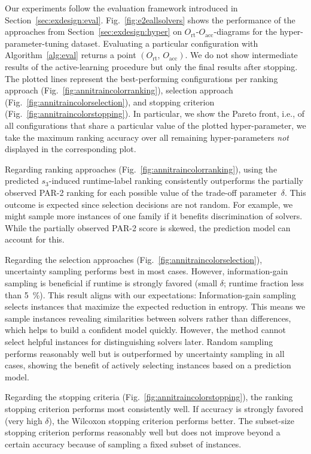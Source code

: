 \documentclass[runningheads]{llncs}
\begin{document}
Our experiments follow the evaluation framework introduced in Section~\ref{sec:exdesign:eval}.
Fig.~\ref{fig:e2eallsolvers} shows the performance of the approaches from Section~\ref{sec:exdesign:hyper} on $O_{\operatorname{rt}}$-$O_{\operatorname{acc}}$-diagrams for the hyper-parameter-tuning dataset.
Evaluating a particular configuration with Algorithm~\ref{alg:eval} returns a point $\left(O_{\operatorname{rt}},\, O_{\operatorname{acc}}\right)$.
We do not show intermediate results of the active-learning procedure but only the final results after stopping.
The plotted lines represent the best-performing configurations per ranking approach (Fig.~\ref{fig:annitraincolorranking}), selection approach (Fig.~\ref{fig:annitraincolorselection}), and stopping criterion (Fig.~\ref{fig:annitraincolorstopping}).
In particular, we show the Pareto front, i.e., of all configurations that share a particular value of the plotted hyper-parameter, we take the maximum ranking accuracy over all remaining hyper-parameters \emph{not} displayed in the corresponding plot.

Regarding ranking approaches (Fig.~\ref{fig:annitraincolorranking}), using the predicted $s_3$-induced run\-time-label rank\-ing consistently outperforms the partially observed PAR-2 ranking for each possible value of the trade-off parameter~$\delta$.
This outcome is expected since selection decisions are not random.
For example, we might sample more instances of one family if it benefits discrimination of solvers.
While the partially observed PAR-2 score is skewed, the prediction model can account for this.

Regarding the selection approaches (Fig.~\ref{fig:annitraincolorselection}), uncertainty sampling performs best in most cases.
However, information-gain sampling is beneficial if runtime is strongly favored (small $\delta$; runtime fraction less than \SI{5}{\%}).
This result aligns with our expectations:
Information-gain sampling selects instances that maximize the expected reduction in entropy.
This means we sample instances revealing similarities between solvers rather than differences, which helps to build a confident model quickly.
However, the method cannot select helpful instances for distinguishing solvers later.
Random sampling performs reasonably well but is outperformed by uncertainty sampling in all cases, showing the benefit of actively selecting instances based on a prediction model.

Regarding the stopping criteria (Fig.~\ref{fig:annitraincolorstopping}), the ranking stopping criterion performs most consistently well.
If accuracy is strongly favored (very high $\delta$), the Wilcoxon stopping criterion performs better.
The subset-size stopping criterion performs reasonably well but does not improve beyond a certain accuracy because of sampling a fixed subset of instances.
\end{document}
